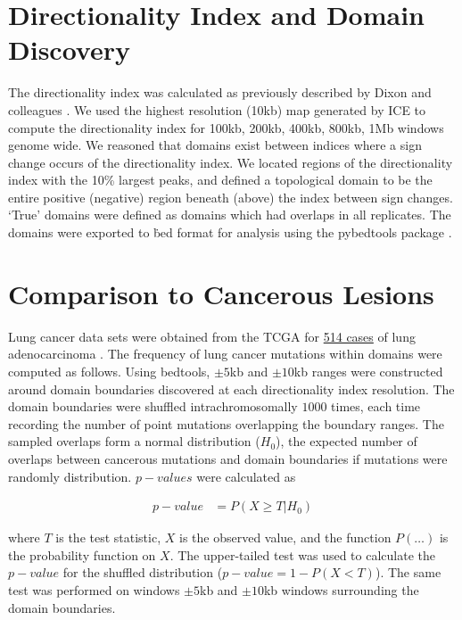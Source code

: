 \section*{Directionality Index and Domain Discovery}

The directionality index was calculated as previously described by Dixon and colleagues \citep{dixon2012}.  We used the highest
resolution (10kb) map generated by \gls{ICE} to compute the directionality index for 100kb, 200kb, 400kb, 800kb, 1Mb windows
genome wide.  We reasoned that domains exist between indices where a sign change occurs of the directionality index.  We located
regions of the directionality index with the 10\% largest peaks, and defined a topological domain to be the entire positive (negative)
region beneath (above) the index between sign changes.   `True' domains were defined as domains which had overlaps in all replicates.
The domains were exported to \.bed format for analysis using the pybedtools package \citep{quinlan2010,dale2011}.

\section*{Comparison to Cancerous Lesions}\label{sec:resampling}

Lung cancer data sets were obtained from the \gls{TCGA} for
\href{https://tcga-data.nci.nih.gov/tcga/tcgaCancerDetails.jsp?diseaseType=LUAD&diseaseName=Lung\%20adenocarcinoma}{514 cases}
of lung adenocarcinoma \citep{cerami2012,gao2013}.  The frequency of lung cancer mutations within domains were computed as follows.
Using bedtools, $\pm 5$kb and $\pm 10$kb ranges were constructed around domain boundaries discovered at each directionality index
resolution.  The domain boundaries were shuffled intrachromosomally $1000$ times, each time recording the number of point mutations
overlapping the boundary ranges.  The sampled overlaps form a normal distribution ($H_0$), the expected number of overlaps between
cancerous mutations and domain boundaries if mutations were randomly distribution.  $p-values$ were calculated as

\begin{align}
  p-value &= P(X \geq T | H_0)
\end{align}

where $T$ is the test statistic, $X$ is the observed value, and the function $P(\dots)$ is the probability function on $X$.  The upper-tailed
test was used to calculate the $p-value$ for the shuffled distribution ($p-value = 1 - P(X < T)$).  The same test was performed on windows
$\pm5$kb and $\pm10$kb windows surrounding the domain boundaries.

